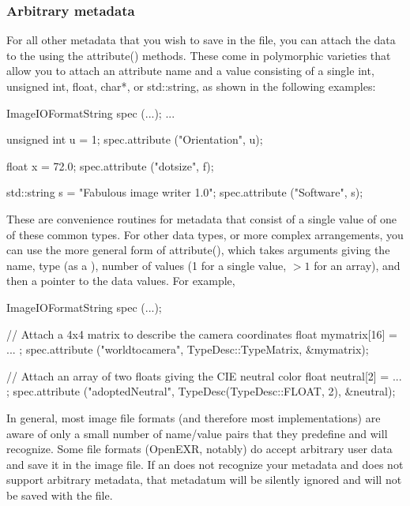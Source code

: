 \subsubsection{Arbitrary metadata}

For all other metadata that you wish to save in the file, you can attach
the data to the \ImageSpec using the {\cf attribute()} methods.
These come in polymorphic varieties that allow you to attach an
attribute name and a value consisting of a single {\cf int}, {\cf
  unsigned int}, {\cf float}, {\cf char*}, or {\cf std::string}, as
shown in the following examples:

\begin{code}
        ImageIOFormatString spec (...);
        ...

        unsigned int u = 1;
        spec.attribute ("Orientation", u);

        float x = 72.0;
        spec.attribute ("dotsize", f);

        std::string s = "Fabulous image writer 1.0";
        spec.attribute ("Software", s);
\end{code}

These are convenience routines for metadata that consist of a single
value of one of these common types.  For other data types, or more
complex arrangements, you can use the more general form of {\cf
  attribute()}, which takes arguments giving the name, type (as a
\TypeDesc), number of values (1 for a single value, $>1$ for an
  array), and then a pointer to the data values.  For example,

\begin{code}
        ImageIOFormatString spec (...);

        // Attach a 4x4 matrix to describe the camera coordinates
        float mymatrix[16] = { ... };
        spec.attribute ("worldtocamera", TypeDesc::TypeMatrix, &mymatrix);

        // Attach an array of two floats giving the CIE neutral color
        float neutral[2] = { ... };
        spec.attribute ("adoptedNeutral", TypeDesc(TypeDesc::FLOAT, 2), &neutral);
\end{code}

In general, most image file formats (and therefore most \ImageOutput
implementations) are aware of only a small number of name/value pairs
that they predefine and will recognize.  Some file formats (OpenEXR,
notably) do accept arbitrary user data and save it in the image file.
If an \ImageOutput does not recognize your metadata and does not support
arbitrary metadata, that metadatum will be silently ignored and will not
be saved with the file.

